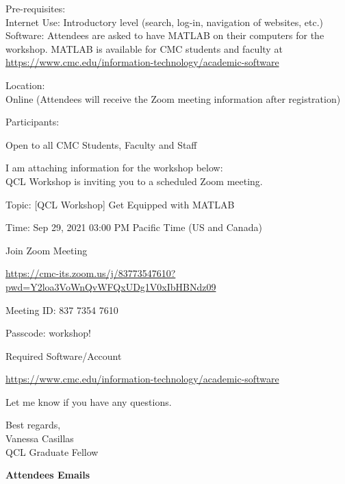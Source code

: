 \documentclass[
]{book}
\begin{document}
Pre-requisites:\\
Internet Use: Introductory level (search, log-in, navigation of websites, etc.)
Software: Attendees are asked to have MATLAB on their computers for the workshop. MATLAB is available for CMC students and faculty at \url{https://www.cmc.edu/information-technology/academic-software}

Location:\\
Online (Attendees will receive the Zoom meeting information after registration)

Participants:

Open to all CMC Students, Faculty and Staff

I am attaching information for the workshop below:\\
QCL Workshop is inviting you to a scheduled Zoom meeting.

Topic: {[}QCL Workshop{]} Get Equipped with MATLAB

Time: Sep 29, 2021 03:00 PM Pacific Time (US and Canada)

Join Zoom Meeting

\url{https://cmc-its.zoom.us/j/83773547610?pwd=Y2loa3VoWnQvWFQxUDg1V0xIbHBNdz09}

Meeting ID: 837 7354 7610

Passcode: workshop!

Required Software/Account

\url{https://www.cmc.edu/information-technology/academic-software}

Let me know if you have any questions.

Best regards,\\
Vanessa Casillas\\
QCL Graduate Fellow

\textbf{Attendees Emails}
\end{document}
